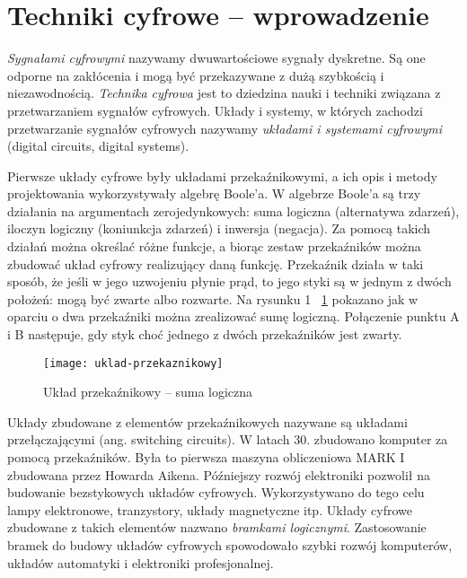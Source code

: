 \documentclass[openany,a4paper,11pt]{article}
\begin{document}
\section*{Techniki cyfrowe – wprowadzenie}
\label{sec:techniki}

\emph {Sygnałami cyfrowymi }nazywamy dwuwartościowe sygnały dyskretne. Są one odporne na zakłócenia i mogą być przekazywane z dużą szybkością i niezawodnością.\emph{ Technika cyfrowa }jest to dziedzina nauki i techniki związana z przetwarzaniem sygnałów cyfrowych. Układy i systemy, w których zachodzi przetwarzanie sygnałów cyfrowych nazywamy \emph {układami i systemami cyfrowymi }(digital circuits, digital systems). 

Pierwsze układy cyfrowe były układami przekaźnikowymi, a ich opis i metody projektowania wykorzystywały algebrę Boole'a. W algebrze Boole'a są trzy działania na argumentach zerojedynkowych: suma logiczna (alternatywa zdarzeń), iloczyn logiczny (koniunkcja zdarzeń) i inwersja (negacja). Za pomocą takich działań można określać różne funkcje, a biorąc zestaw przekaźników można zbudować układ cyfrowy realizujący daną funkcję. Przekaźnik działa w taki sposób, że jeśli w jego  uzwojeniu płynie prąd, to jego styki są w jednym z dwóch położeń: mogą być zwarte albo rozwarte. Na rysunku 1 ~\ref {rs:rys}  pokazano jak w oparciu o dwa przekaźniki można zrealizować sumę logiczną. Połączenie punktu A i B następuje, gdy styk choć jednego z dwóch przekaźników jest zwarty.


\begin{figure}[h]
\label{rs:rys}
\centerline{\texttt{[image: uklad-przekaznikowy]}}
\caption{Układ przekaźnikowy – suma logiczna}
\end{figure}



 Układy zbudowane z elementów przekaźnikowych nazywane są układami przełączającymi (ang. switching circuits).  W latach 30. zbudowano komputer za pomocą przekaźników. Była to pierwsza maszyna obliczeniowa MARK I zbudowana przez Howarda Aikena. Późniejszy rozwój elektroniki pozwolił na budowanie bezstykowych układów cyfrowych. Wykorzystywano do tego celu lampy elektronowe, tranzystory, układy magnetyczne itp. Układy cyfrowe zbudowane z takich elementów nazwano \emph { bramkami logicznymi}. Zastosowanie bramek do budowy układów cyfrowych spowodowało szybki rozwój komputerów, układów automatyki i elektroniki profesjonalnej.
\end{document}
